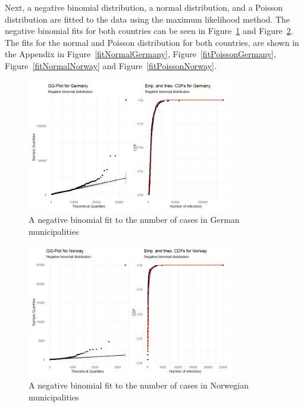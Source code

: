Next, a negative binomial distribution, a normal distribution, and a Poisson distribution are fitted to the data using the maximum likelihood method. The negative binomial fits for both countries can be seen in Figure~\ref{fitNegbinomGermany} and Figure~\ref{fitNegbinomNorway}. The fits for the normal and Poisson distribution for both countries, are shown in the Appendix in Figure~\ref{fitNormalGermany}, Figure~\ref{fitPoissonGermany}, Figure~\ref{fitNormalNorway} and Figure~\ref{fitPoissonNorway}.
%     
\begin{figure}[H]
    \centering
    \includegraphics[width = 0.8\textwidth]{fit_nbinom_germany.png}
    \caption{A negative binomial fit to the number of cases in German municipalities}
    \label{fitNegbinomGermany}
\end{figure}
%     
\begin{figure}[H]
    \centering
    \includegraphics[width = 0.8\textwidth]{fit_nbinom_norway.png}
    \caption{A negative binomial fit to the number of cases in Norwegian municipalities}
    \label{fitNegbinomNorway}
\end{figure}
